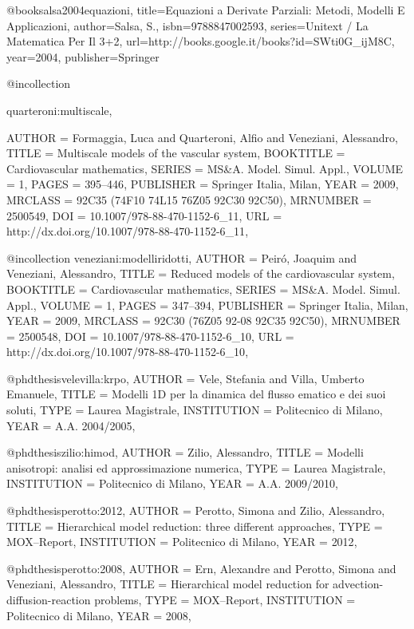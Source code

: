 @book{salsa2004equazioni,
  title={Equazioni a Derivate Parziali: Metodi, Modelli E Applicazioni},
  author={Salsa, S.},
  isbn={9788847002593},
  series={Unitext / La Matematica Per Il 3+2},
  url={http://books.google.it/books?id=SWti0G\_ijM8C},
  year={2004},
  publisher={Springer}
}

@incollection{quarteroni:multiscale,
    		
    AUTHOR = {Formaggia, Luca and Quarteroni, Alfio and Veneziani, Alessandro},
     TITLE = {Multiscale models of the vascular system},
 BOOKTITLE = {Cardiovascular mathematics},
    SERIES = {MS{\&}A. Model. Simul. Appl.},
    VOLUME = {1},
     PAGES = {395--446},
 PUBLISHER = {Springer Italia, Milan},
      YEAR = {2009},
   MRCLASS = {92C35 (74F10 74L15 76Z05 92C30 92C50)},
  MRNUMBER = {2500549},
       DOI = {10.1007/978-88-470-1152-6_11},
       URL = {http://dx.doi.org/10.1007/978-88-470-1152-6_11},
}

@incollection {veneziani:modelliridotti,
    AUTHOR = {Peir{\'o}, Joaquim and Veneziani, Alessandro},
     TITLE = {Reduced models of the cardiovascular system},
 BOOKTITLE = {Cardiovascular mathematics},
    SERIES = {MS\&A. Model. Simul. Appl.},
    VOLUME = {1},
     PAGES = {347--394},
 PUBLISHER = {Springer Italia, Milan},
      YEAR = {2009},
   MRCLASS = {92C30 (76Z05 92-08 92C35 92C50)},
  MRNUMBER = {2500548},
       DOI = {10.1007/978-88-470-1152-6_10},
       URL = {http://dx.doi.org/10.1007/978-88-470-1152-6_10},
}

@phdthesis{velevilla:krpo,
     AUTHOR = {Vele, Stefania and Villa, Umberto Emanuele}, 
      TITLE = {Modelli 1D per la dinamica del flusso ematico e dei suoi soluti},
       TYPE = {Laurea Magistrale},
INSTITUTION = {Politecnico di Milano},
       YEAR = {A.A. 2004/2005},
}

@phdthesis{zilio:himod,
     AUTHOR = {Zilio, Alessandro},
      TITLE = {Modelli anisotropi: analisi ed approssimazione numerica},
       TYPE = {Laurea Magistrale},
INSTITUTION = {Politecnico di Milano},
       YEAR = {A.A. 2009/2010},
}

@phdthesis{perotto:2012,
     AUTHOR = {Perotto, Simona and Zilio, Alessandro},
      TITLE = {Hierarchical model reduction: three different approaches},
       TYPE = {MOX--Report},
INSTITUTION = {Politecnico di Milano},
       YEAR = {2012},
}

@phdthesis{perotto:2008,
     AUTHOR = {Ern, Alexandre and Perotto, Simona and Veneziani, Alessandro},
      TITLE = {Hierarchical model reduction for advection-diffusion-reaction problems},
       TYPE = {MOX--Report},
INSTITUTION = {Politecnico di Milano},
       YEAR = {2008},
}

